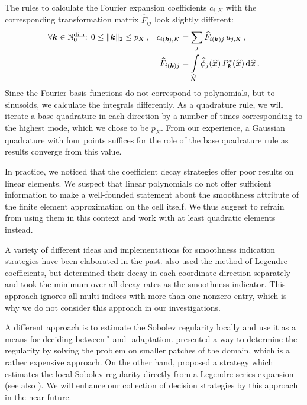 The rules to calculate the Fourier expansion coefficients $c_{i,K}$ with the corresponding transformation matrix $\widehat{F}_{ij}$ look slightly different:
\begin{align}
&\forall \tuple{k} \in \mathbb{N}_0^\text{dim} \text{: } 0 \leq \|\tuple{k}\|_2 \leq p_K \, \text{,} &
c_{i(\tuple{k}),K} &= \sum\limits_j \widehat{F}_{i(\tuple{k})j} \, u_{j,K} \,\text{,} \\
&& \widehat{F}_{i(\tuple{k})j} &= \int\limits_{\widehat{K}} \widehat{\phi}_j(\vec{\widehat{x}}) \, P_\tuple{k}^\ast(\vec{\widehat{x}}) \differential{\vec{\widehat{x}}} \,\text{.}
\end{align}
Since the Fourier basis functions do not correspond to polynomials, but to sinusoids, we calculate the integrals differently. As a quadrature rule, we will iterate a base quadrature in each direction by a number of times corresponding to the highest mode, which we chose to be $p_K$. From our experience, a Gaussian quadrature with four points suffices for the role of the base quadrature rule as results converge from this value.

In practice, we noticed that the coefficient decay strategies offer poor results on linear elements. We suspect that linear polynomials do not offer sufficient information to make a well-founded statement about the smoothness attribute of the finite element approximation on the cell itself. We thus suggest to refrain from using them in this context and work with at least quadratic elements instead.

A variety of different ideas and implementations for smoothness indication strategies have been elaborated in the past. \textcite{davydov2017} also used the method of Legendre coefficients, but determined their decay in each coordinate direction separately and took the minimum over all decay rates as the smoothness indicator. This approach ignores all multi-indices with more than one nonzero entry, which is why we do not consider this approach in our investigations.

A different approach is to estimate the Sobolev regularity locally and use it as a means for deciding between \h- and \p-adaptation. \textcite{ainsworth1998} presented a way to determine the regularity by solving the problem on smaller patches of the domain, which is a rather expensive approach. On the other hand, \textcite{houston2003} proposed a strategy which estimates the local Sobolev regularity directly from a Legendre series expansion (see also \textcite[Sec.~2.4]{houston2005}).
We will enhance our collection of decision strategies by this approach in the near future.

